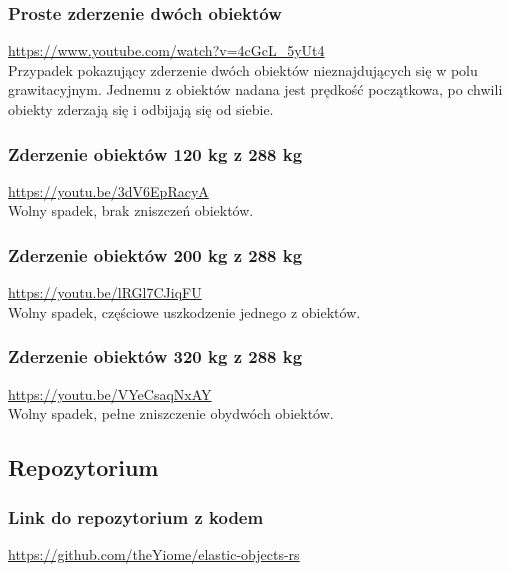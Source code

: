 \documentclass[12pt, letterpaper]{report}
\begin{document}
    \subsubsection{Proste zderzenie dwóch obiektów}
    \url{https://www.youtube.com/watch?v=4cGcL_5yUt4} \\ 

    Przypadek pokazujący zderzenie dwóch obiektów nieznajdujących się w polu grawitacyjnym.
    Jednemu z obiektów nadana jest prędkość początkowa, po chwili obiekty zderzają się i 
    odbijają się od siebie.

    \subsubsection{Zderzenie obiektów 120 kg z 288 kg}
    \url{https://youtu.be/3dV6EpRacyA} \\

    Wolny spadek, brak zniszczeń obiektów.

    \subsubsection{Zderzenie obiektów 200 kg z 288 kg}
    \url{https://youtu.be/lRGl7CJiqFU} \\

    Wolny spadek, częściowe uszkodzenie jednego z obiektów.

    \subsubsection{Zderzenie obiektów 320 kg z 288 kg}
    \url{https://youtu.be/VYeCsaqNxAY} \\

    Wolny spadek, pełne zniszczenie obydwóch obiektów.

    \subsection{Repozytorium}
    \subsubsection{Link do repozytorium z kodem}
    \url{https://github.com/theYiome/elastic-objects-rs}
\end{document}

